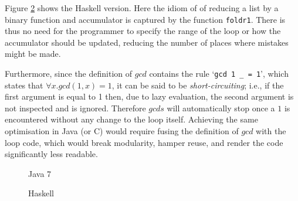 Figure \ref{fig:gcds:haskell} shows the Haskell version. Here the idiom
of of reducing a list by a binary function and accumulator is captured
by the function \lstinline|foldr1|. There is thus no need for the programmer
to specify the range of the loop or how the accumulator should be updated,
reducing the number of places where mistakes might be made.

Furthermore, since the definition of $gcd$ contains the rule
`\lstinline|gcd 1 _ = 1|',
which states that $\forall x. gcd (1, x) = 1$, it can be said to be
\emph{short-circuiting}; i.e., if the first argument is equal to 1 then, due
to lazy evaluation, the second argument is not inspected and is ignored.
Therefore $gcds$ will automatically stop once a $1$ is encountered without any
change to the loop itself. Achieving the same optimisation in Java (or C) would
require fusing the definition of $gcd$ with the loop code, which would break
modularity, hamper reuse, and render the code significantly less readable.

% 

\begin{figure}

\caption{Java 7}
\label{fig:gcds:java}
\end{figure}

\begin{figure}

\caption{Haskell}
\label{fig:gcds:haskell}
\end{figure}





